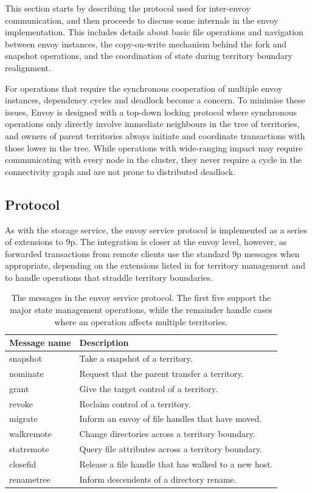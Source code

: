 This section starts by describing the protocol used for inter-envoy communication, and then proceeds to discuss some internals in the envoy implementation. This includes details about basic file operations and navigation between envoy instances, the copy-on-write mechanism behind the fork and snapshot operations, and the coordination of state during territory boundary realignment.

For operations that require the synchronous cooperation of multiple envoy instances, dependency cycles and deadlock become a concern. To minimise these issues, Envoy is designed with a top-down locking protocol where synchronous operations only directly involve immediate neighbours in the tree of territories, and owners of parent territories always initiate and coordinate transactions with those lower in the tree. While operations with wide-ranging impact may require communicating with every node in the cluster, they never require a cycle in the connectivity graph and are not prone to distributed deadlock.

\subsection{Protocol}

As with the storage service, the envoy service protocol is implemented as a series of extensions to 9p. The integration is closer at the envoy level, however, as forwarded transactions from remote clients use the standard 9p messages when appropriate, depending on the extensions listed in  for territory management and to handle operations that straddle territory boundaries.

\begin{table}[t]
\begin{center}
\begin{tabular}{>{\ttfamily}l|l}
\textbf{\textrm{Message name}} & \textbf{Description} \\ \hline
snapshot & Take a snapshot of a territory. \\
nominate & Request that the parent transfer a territory. \\
grant & Give the target control of a territory. \\
revoke & Reclaim control of a territory. \\
migrate & Inform an envoy of file handles that have moved. \\
walkremote & Change directories across a territory boundary. \\
statremote & Query file attributes across a territory boundary. \\
closefid & Release a file handle that has walked to a new host. \\
renametree & Inform descendents of a directory rename.
\end{tabular}
\end{center}
\caption[Additional messages in the envoy service protocol]{The messages in the envoy service protocol. The first five support the major state management operations, while the remainder handle cases where an operation affects multiple territories.}
\label{tab:envoy-messages}
\end{table}


